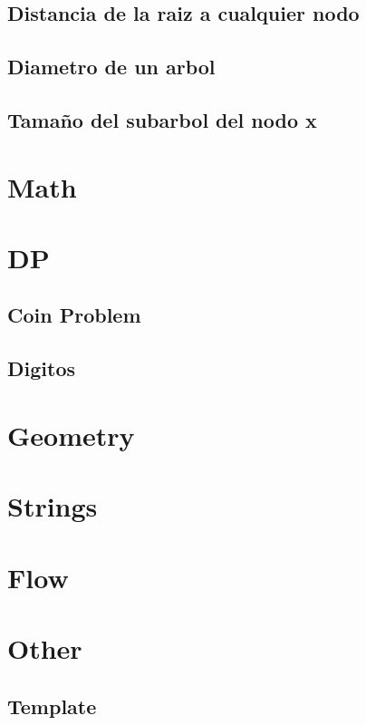 	\subsection{Distancia de la raiz a cualquier nodo}
	\subsection{Diametro de un arbol}
	\subsection{Tamaño del subarbol del nodo x}


\section{Math}

\section{DP}
	\subsection{Coin Problem}
	\subsection{Digitos}

\section{Geometry}


\section{Strings}


\section{Flow}


\section{Other}
	\subsection{Template}




